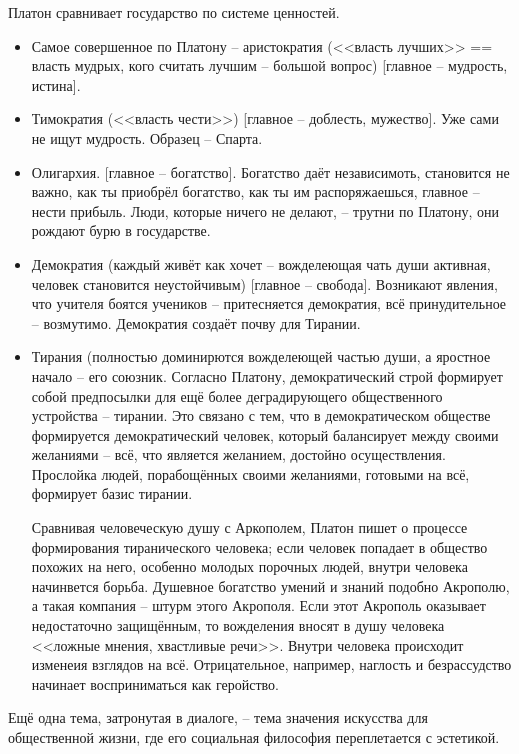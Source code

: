\documentclass[a4paper, 12pt]{article} %
\begin{document}
Платон сравнивает государство по системе ценностей.

\begin{itemize}
\item Самое совершенное по Платону -- аристократия (<<власть лучших>> == власть мудрых, кого считать лучшим -- большой вопрос) [главное -- мудрость, истина].
\item Тимократия (<<власть чести>>) [главное -- доблесть, мужество]. Уже сами не ищут мудрость. Образец -- Спарта.
\item Олигархия. [главное -- богатство]. Богатство даёт независимоть, становится не важно, как ты приобрёл богатство, как ты им распоряжаешься, главное -- нести прибыль. Люди, которые ничего не делают, -- трутни по Платону, они рождают бурю в государстве.
\item Демократия (каждый живёт как хочет -- вожделеющая чать души активная, человек становится неустойчивым) [главное -- свобода]. Возникают явления, что учителя боятся учеников -- притесняется демократия, всё принудительное -- возмутимо. Демократия создаёт почву для Тирании.
\item Тирания (полностью доминирются вожделеющей частью души, а яростное начало -- его союзник. 
Согласно Платону, демократический строй формирует собой предпосылки для ещё более деградирующего общественного устройства -- тирании. Это связано с тем, что в демократическом обществе формируется демократический человек, который балансирует между своими желаниями --  всё, что является желанием, достойно осуществления. Прослойка людей, порабощённых своими желаниями, готовыми на всё, формирует базис тирании.

Сравнивая человеческую душу с Аркополем, Платон пишет о процессе формирования тиранического человека; если человек попадает в общество похожих на него, особенно молодых порочных людей, внутри человека начинвется борьба. 
Душевное богатство умений и знаний подобно Акрополю, а такая компания -- штурм этого Акрополя. Если этот Акрополь оказывает недостаточно защищённым, то вожделения вносят в душу человека <<ложные мнения, хвастливые речи>>. Внутри человека происходит изменеия взглядов на всё. Отрицательное, например, наглость и безрассудство начинает восприниматься как геройство. 

\end{itemize}

Ещё одна тема, затронутая в диалоге, -- тема значения искусства для общественной жизни, где его социальная философия переплетается с эстетикой. 
\end{document}
